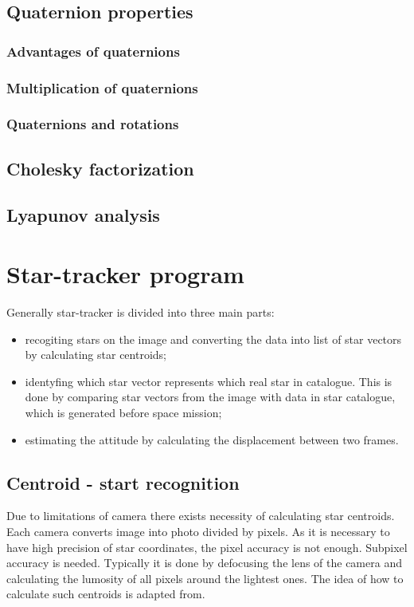 \documentclass[12pt,a4paper,oneside]{article}
\begin{document}
\subsection{Quaternion properties}
\subsubsection{Advantages of quaternions}
\subsubsection{Multiplication of quaternions}
\subsubsection{Quaternions and rotations}
\subsection{Cholesky factorization}
\subsection{Lyapunov analysis}

\newpage
\section{Star-tracker program}
\cite{ju2003overview}\par
Generally star-tracker is divided into three main parts\cite{6187242}:
\begin{itemize}
\item recogiting stars on the image and converting the data into list of star vectors by calculating star centroids;
\item identyfing which star vector represents which real star in catalogue. This is done by comparing star vectors from the image with data in star catalogue, which is generated before space mission;
\item estimating the attitude by calculating the displacement between two frames.
\end{itemize}
\subsection{Centroid - start recognition}
\cite{samaan2002predictive}

\cite{liebe2002accuracy}

Due to limitations of camera there exists necessity of calculating star centroids. Each camera converts image into photo divided by pixels. As it is necessary to have high precision of star coordinates, the pixel accuracy is not enough. Subpixel accuracy is needed. Typically it is done by defocusing the lens of the camera and calculating the lumosity of all pixels around the lightest ones. The idea of how to calculate such centroids is adapted from\cite{6187242}.
\end{document}
